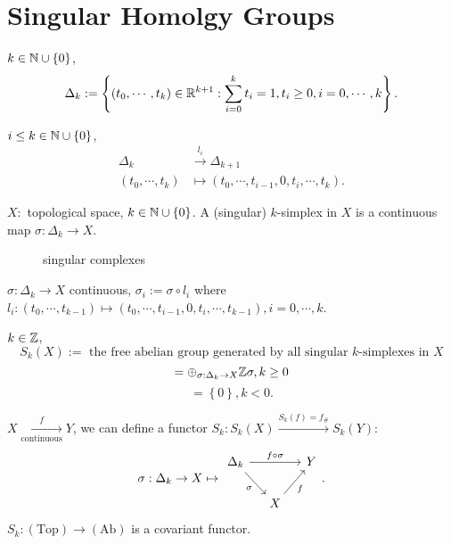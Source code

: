 \section{Singular Homolgy Groups}
\begin{definition}
  $k\in \mathbb{N} \cup \left\{0\right\} $, 
  \[
    \Delta_k :=\left\{(t_0,\cdots,t_k)\in \mathbb{R}^{k+1}: \sum_{i=0}^{k} t_i=1,t_i\ge 0,i=0,\cdots,k\right\} .
  \]
\end{definition}
\begin{definition}
  $i\le k \in \mathbb{N} \cup \left\{0\right\} $,
  \begin{align*}
    \Delta_{k}&\xrightarrow{l_i}\Delta_{k+1}\\
    (t_0,\cdots,t_k)&\mapsto \left( t_0,\cdots,t_{i-1},0,t_{i},\cdots,t_{k} \right). 
  \end{align*} 
\end{definition}
\begin{definition}
  $X:$ topological space, $k\in \mathbb{N}\cup \left\{0\right\} $. A (singular) $k$-simplex in $X$ is 
  a continuous map $\sigma :\Delta_k\to X$.
\begin{figure}[ht]
    \centering
    \caption{singular complexes}
    \label{fig:singular-complexes}
\end{figure}
\end{definition}
\begin{definition}
  $\sigma:\Delta_k\to X$ continuous, $\sigma_i:=\sigma\circ l_i$ where $l_i:(t_0,\cdots,t_{k-1})\mapsto (t_0,\cdots,t_{i-1},0,t_{i},\cdots,t_{k-1}),i=0,\cdots,k$.
\end{definition}
\begin{definition}
  $k\in \mathbb{Z}$, 
  \[
    S_k(X):= \text{ the free abelian group generated by all singular } k\text{-simplexes in }X
  \] 
  \[
  =\oplus_{\sigma:\Delta_k\to X }\mathbb{Z}{\sigma}, k\ge 0
  \] 
  \[
  =\left\{0\right\} ,k<0.
  \] 
\end{definition}
$X\xrightarrow[\text{continuous}]{f}Y$, we can define a functor $S_k:S_k(X)\xrightarrow{S_k(f)=f_{\#}}S_k(Y)$:
\[
\sigma:\Delta_k\to X \mapsto 
\begin{tikzcd}[column sep=small]
\Delta_k\arrow{rr}{f\circ\sigma} \arrow[swap]{rd}{\sigma} & & Y\\
   & X  \arrow[swap]{ru}{f}& 
\end{tikzcd}
.\] 
$S_k:(\text{Top})\rightarrow (\text{Ab})$ is a covariant functor.

